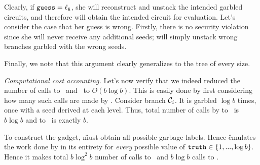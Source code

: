 Clearly, if $\mathtt{guess}=\mathtt{\ell_{A}}$, she will reconstruct and unstack the intended garbled circuits, and therefore will obtain the intended circuit for evaluation.  Let's consider the case that her guess is wrong. Firstly, there is no security violation since she will never receive any additional seeds; \E will simply unstack wrong branches garbled with the wrong seeds.





Finally, we note  that this argument clearly generalizes to the tree of every size.


{\em Computational cost accounting.} Let's now verify that we indeed reduced the number of calls to \Gb\ and \Ev\ to $O(b \log b)$.  This is easily done by first considering how many such calls are made by \E.  
Consider branch $\mathcal C_i$.  It is garbled $\log b$ times, once with a seed derived at each level.  Thus, total number of calls by \E to \Gb\ is $b \log b$ and to \Ev\ is exactly $b$.  

To construct the gadget, \G must obtain all possible garbage labels.  Hence \G emulates the work done by \E in its entirety  for {\em every} possible value of $\mathtt{truth}\in\{1,...,\log b\}$.  Hence it makes total  $b \log^2 b$ number of calls to \Gb\ and $b \log b$ calls to  \Ev.  




















